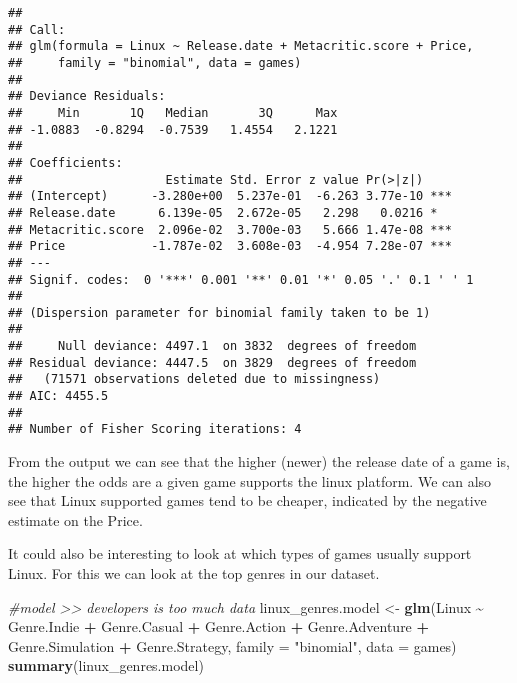 \documentclass[
]{article}
\newenvironment{Shaded}{\begin{snugshade}}{\end{snugshade}}
\newcommand{\AttributeTok}[1]{\textcolor[rgb]{0.13,0.29,0.53}{#1}}
\newcommand{\CommentTok}[1]{\textcolor[rgb]{0.56,0.35,0.01}{\textit{#1}}}
\newcommand{\FunctionTok}[1]{\textcolor[rgb]{0.13,0.29,0.53}{\textbf{#1}}}
\newcommand{\NormalTok}[1]{#1}
\newcommand{\OtherTok}[1]{\textcolor[rgb]{0.56,0.35,0.01}{#1}}
\newcommand{\SpecialCharTok}[1]{\textcolor[rgb]{0.81,0.36,0.00}{\textbf{#1}}}
\newcommand{\StringTok}[1]{\textcolor[rgb]{0.31,0.60,0.02}{#1}}
\begin{document}
\begin{verbatim}
## 
## Call:
## glm(formula = Linux ~ Release.date + Metacritic.score + Price, 
##     family = "binomial", data = games)
## 
## Deviance Residuals: 
##     Min       1Q   Median       3Q      Max  
## -1.0883  -0.8294  -0.7539   1.4554   2.1221  
## 
## Coefficients:
##                    Estimate Std. Error z value Pr(>|z|)    
## (Intercept)      -3.280e+00  5.237e-01  -6.263 3.77e-10 ***
## Release.date      6.139e-05  2.672e-05   2.298   0.0216 *  
## Metacritic.score  2.096e-02  3.700e-03   5.666 1.47e-08 ***
## Price            -1.787e-02  3.608e-03  -4.954 7.28e-07 ***
## ---
## Signif. codes:  0 '***' 0.001 '**' 0.01 '*' 0.05 '.' 0.1 ' ' 1
## 
## (Dispersion parameter for binomial family taken to be 1)
## 
##     Null deviance: 4497.1  on 3832  degrees of freedom
## Residual deviance: 4447.5  on 3829  degrees of freedom
##   (71571 observations deleted due to missingness)
## AIC: 4455.5
## 
## Number of Fisher Scoring iterations: 4
\end{verbatim}

From the output we can see that the higher (newer) the release date of a
game is, the higher the odds are a given game supports the linux
platform. We can also see that Linux supported games tend to be cheaper,
indicated by the negative estimate on the Price.

It could also be interesting to look at which types of games usually
support Linux. For this we can look at the top genres in our dataset.

\begin{Shaded}
\begin{Highlighting}[]
\CommentTok{\#model \textgreater{}\textgreater{} developers is too much data}
\NormalTok{linux\_genres.model }\OtherTok{\textless{}{-}} \FunctionTok{glm}\NormalTok{(Linux }\SpecialCharTok{\textasciitilde{}}\NormalTok{ Genre.Indie }\SpecialCharTok{+}\NormalTok{ Genre.Casual }\SpecialCharTok{+}\NormalTok{ Genre.Action }\SpecialCharTok{+}\NormalTok{ Genre.Adventure }\SpecialCharTok{+}\NormalTok{ Genre.Simulation }\SpecialCharTok{+}\NormalTok{ Genre.Strategy, }\AttributeTok{family =} \StringTok{"binomial"}\NormalTok{, }\AttributeTok{data =}\NormalTok{ games)}
\FunctionTok{summary}\NormalTok{(linux\_genres.model)}
\end{Highlighting}
\end{Shaded}
\end{document}
